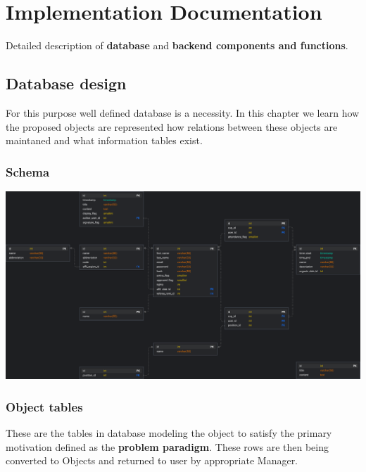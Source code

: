 \chapter{Implementation Documentation}
Detailed description of \textbf{database} and \textbf{backend components and functions}.  

\section{Database design}
For this purpose well defined database is a necessity. In this chapter we learn how the proposed objects are represented how relations between these objects are maintaned and what information tables exist.
\subsection{Schema}
\par
\includegraphics[scale=0.2175]{img/swimmpair_db_schema.png}
\subsection{Object tables}
These are the tables in database modeling the object to satisfy the primary motivation defined as the \textbf{problem paradigm}. These rows are then being converted to Objects and returned to user by appropriate Manager.
